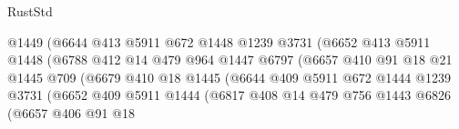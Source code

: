 \begin{lexlean}{RustStd}
\begin{coremodule}
                                    @1449
                                    (@6644
                                      @413
                                      @5911
                                      @672
                                      @1448
                                      @1239
                                      @3731
                                      (@6652
                                        @413
                                        @5911
                                        @1448
                                        (@6788
                                          @412
                                          @14
                                          @479
                                          @964
                                          @1447
                                          @6797
                                          (@6657
                                            @410
                                            @91
                                            @18
                                            @21
                                            @1445
                                            @709
                                            (@6679
                                              @410
                                              @18
                                              @1445
                                              (@6644
                                                @409
                                                @5911
                                                @672
                                                @1444
                                                @1239
                                                @3731
                                                (@6652
                                                  @409
                                                  @5911
                                                  @1444
                                                  (@6817
                                                    @408
                                                    @14
                                                    @479
                                                    @756
                                                    @1443
                                                    @6826
                                                    (@6657
                                                      @406
                                                      @91
                                                      @18

\end{coremodule}
\end{lexlean}
